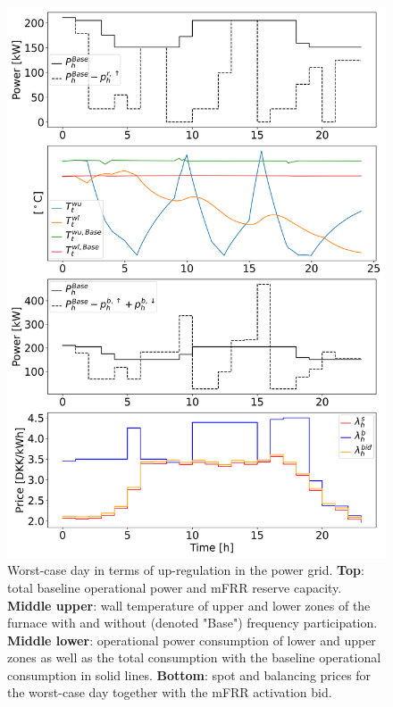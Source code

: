 \documentclass[conference]{IEEEtran}
\begin{document}
\begin{figure}[t]
    \centering
    \includegraphics[width=\columnwidth]{../figures/mfrr_single_case.png}
    \caption{Worst-case day in terms of up-regulation in the power grid. \textbf{Top}: total baseline operational power and mFRR reserve capacity. \textbf{Middle upper}: wall temperature of upper and lower zones of the furnace with and without (denoted "Base") frequency participation. \textbf{Middle lower}: operational power consumption of lower and upper zones as well as the total consumption with the baseline operational consumption in solid lines. \textbf{Bottom}: spot and balancing prices for the worst-case day together with the mFRR activation bid.}
    \label{fig:mfrr_single_case}
\end{figure}
\end{document}
